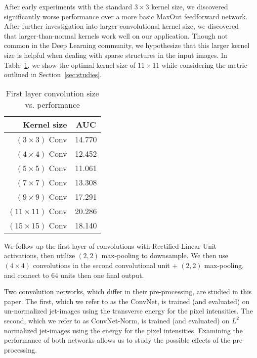 After early experiments with the standard $3\times 3$ kernel size, we discovered significantly worse performance over a more basic MaxOut \cite{maxout:goodfellow} feedforward network. After further investigation into larger convolutional kernel size, we discovered that larger-than-normal kernels work well on our application. Though not common in the Deep Learning community, we hypothesize that this larger kernel size is helpful when dealing with sparse structures in the input images. In Table~\ref{tab:kernelsize}, we show the optimal kernel size of $11\times11$ while considering the metric outlined in Section~\ref{sec:studies}.

\begin{table}[h!]
  \centering
  \begin{tabular}{r|c}
    \bfseries Kernel size & \bfseries AUC \\ 
    \hline
    $(3 \times 3)$ Conv & 14.770 \\
    \hline
    $(4 \times 4)$ Conv & 12.452 \\
    \hline
    $(5 \times 5)$ Conv & 11.061 \\
    \hline
    $(7 \times 7)$ Conv & 13.308 \\
    \hline
    $(9 \times 9)$ Conv & 17.291 \\
    \hline
    $(11 \times 11)$ Conv & 20.286 \\
    \hline
    $(15 \times 15)$ Conv & 18.140 \\
  \end{tabular}
  \caption{First layer convolution size vs. performance}
  \label{tab:kernelsize}
\end{table}

We follow up the first layer of convolutions with Rectified Linear Unit activations, then utilize $(2, 2)$ max-pooling to downsample. We then use $(4\times 4)$ convolutions in the second convolutional unit + $(2, 2)$ max-pooling, and connect to 64 units then one final output.

Two convolution networks, which differ in their pre-processing, are studied in this paper.  The first, which we refer to as the ConvNet, is trained (and evaluated) on un-normalized jet-images using the transverse energy for the pixel intensities.  The second, which we refer to as ConvNet-Norm, is trained (and evaluated) on $L^{2}$ normalized jet-images using the energy for the pixel intensities.  Examining the performance of both networks allows us to study the possible effects of the pre-processing.



